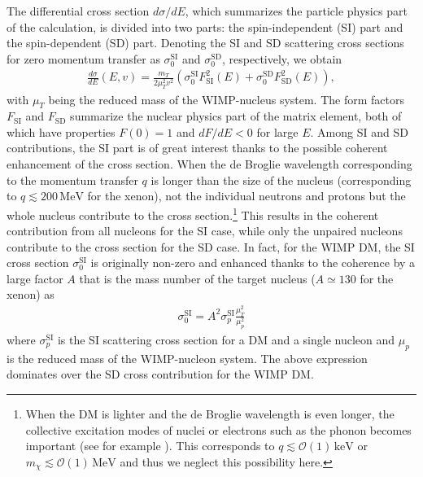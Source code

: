 \documentclass[12pt,twoside,book]{article}
\begin{document}
The differential cross section $d\sigma / dE$, which summarizes the particle physics part of the calculation, is divided into two parts: the spin-independent (SI) part and the spin-dependent (SD) part.
Denoting the SI and SD scattering cross sections for zero momentum transfer as $\sigma_0^{\mathrm{SI}}$ and $\sigma_0^{\mathrm{SD}}$, respectively, we obtain
\begin{align}
  \frac{d\sigma}{d E} (E, v) = \frac{m_T}{2 \mu_T^2 v^2}
  \left( \sigma_0^{\mathrm{SI}} F_{\mathrm{SI}}^2 (E)
  + \sigma_0^{\mathrm{SD}} F_{\mathrm{SD}}^2 (E) \right),
\end{align}
with $\mu_T$ being the reduced mass of the WIMP-nucleus system.
The form factors $F_{\mathrm{SI}}$ and $F_{\mathrm{SD}}$ summarize the nuclear physics part of the matrix element, both of which have properties $F(0)=1$ and $dF / dE < 0$ for large $E$.
Among SI and SD contributions, the SI part is of great interest thanks to the possible coherent enhancement of the cross section.
When the de Broglie wavelength corresponding to the momentum transfer $q$ is longer than the size of the nucleus (corresponding to $q \lesssim 200\,\mathrm{MeV}$ for the xenon), not the individual neutrons and protons but the whole nucleus contribute to the cross section.\footnote{
  When the DM is lighter and the de Broglie wavelength is even longer, the collective excitation modes of nuclei or electrons such as the phonon becomes important (see for example \cite{Knapen:2017xzo}).
  This corresponds to $q \lesssim \mathcal{O}(1)\,\mathrm{keV}$ or $m_\chi \lesssim \mathcal{O}(1)\,\mathrm{MeV}$ and thus we neglect this possibility here.
}
This results in the coherent contribution from all nucleons for the SI case, while only the unpaired nucleons contribute to the cross section for the SD case.
In fact, for the WIMP DM, the SI cross section $\sigma_0^{\mathrm{SI}}$ is originally non-zero and enhanced thanks to the coherence by a large factor $A$ that is the mass number of the target nucleus ($A \simeq 130$ for the xenon) as
\begin{align}
  \sigma_0^{\mathrm{SI}} = A^2 \sigma_p^{\mathrm{SI}} \frac{\mu_T^2}{\mu_p^2}
\end{align}
where $\sigma_p^{\mathrm{SI}}$ is the SI scattering cross section for a DM and a single nucleon and $\mu_p$ is the reduced mass of the WIMP-nucleon system.
The above expression dominates over the SD cross contribution for the WIMP DM.
\end{document}
